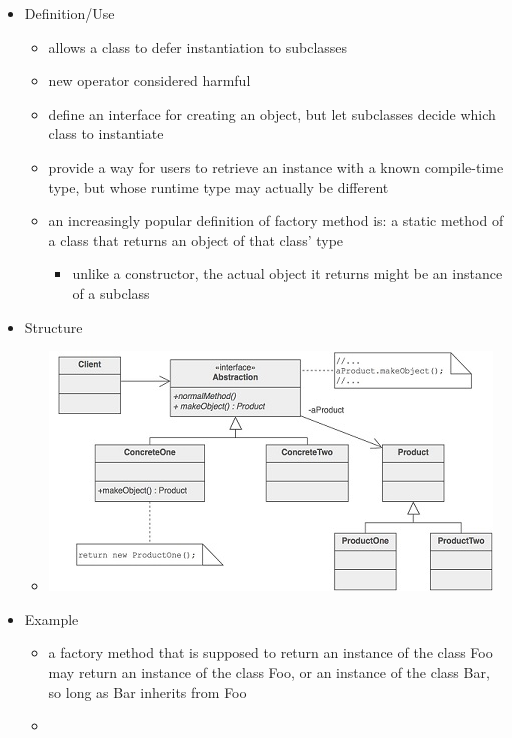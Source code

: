 \documentclass[11pt]{article}
\begin{document}
\begin{itemize}
   \item Definition/Use

   \begin{itemize}
     \item allows a class to defer instantiation to subclasses
     \item new operator considered harmful
     \item define an interface for creating an object, but let subclasses decide which class to instantiate
     \item provide a way for users to retrieve an instance with a known compile-time type, but whose runtime type may actually be different
     \item an increasingly popular definition of factory method is: a static method of a class that returns an object of that class' type

     \begin{itemize}
       \item unlike a constructor, the actual object it returns might be an instance of a subclass
     \end{itemize}

   \end{itemize}

   \item Structure

   \begin{itemize}
     \item \includegraphics{factory_method_example}
   \end{itemize}

   \item Example

   \begin{itemize}
     \item a factory method that is supposed to return an instance of the class Foo may return an instance of the class Foo, or an instance of the class Bar, so long as Bar inherits from Foo
     \item 


\end{itemize}
\end{itemize}
\end{document}

